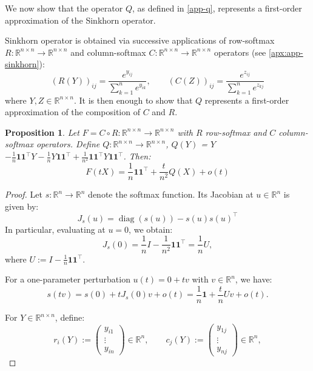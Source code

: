 \documentclass{article}
\newcommand{\R}{\mathbb{R}}
\theoremstyle{definition}
\theoremstyle{plain}
\newtheorem{proposition}{Proposition}
\newcommand{\lra}{\longrightarrow}
\begin{document}
\begin{appendices}
We now show that the operator $Q$, as defined in \cref{app-q}, represents a first-order approximation of the Sinkhorn operator. 

Sinkhorn operator is obtained via successive applications of row-softmax $R:\R^{n\times n} \lra \R^{n\times n}$ and column-softmax $C:\R^{n\times n} \lra \R^{n\times n}$ operators (see \cref{apx:app-sinkhorn}):
\[
(R(Y))_{ij} = \frac{e^{y_{ij}}}{\sum_{k=1}^n e^{y_{ik}}}, \qquad
(C(Z))_{ij} = \frac{e^{z_{ij}}}{\sum_{k=1}^n e^{z_{kj}}}
\]
where $Y, Z \in \R^{n\times n}$. It is then enough to show that $Q$ represents a first-order approximation of the composition of $C$ and $R$.

\begin{proposition}\label{sink_approx}
Let $F=C \circ R: \R^{n\times n} \lra \R^{n\times n}$ with $R$ row-softmax and $C$ column-softmax operators. Define $Q:\R^{n\times n} \lra \R^{n\times n}$,
$Q(Y) $ = $ Y$
$- \frac{1}{n} \mathbf{1}\mathbf{1}^\top Y
- \frac{1}{n} Y \mathbf{1}\mathbf{1}^\top
+ \frac{1}{n^2} \mathbf{1}\mathbf{1}^\top Y \mathbf{1}\mathbf{1}^\top$.
Then:
\begin{equation}\label{f-op}
F(tX)=\frac{1}{n}\mathbf{1}\mathbf{1}^\top+\frac{t}{n^2}Q(X)+o(t)
\end{equation}
\end{proposition}

\begin{proof}
Let $s: \R^n \lra \R^n$ denote the softmax function. Its Jacobian at $u \in \R^n$ is given by:
$$
J_s(u)=\operatorname{diag}(s(u)) - s(u)s(u)^\top
$$
In particular, evaluating at $u = 0$, we obtain:
\[
J_s(0) = \frac{1}{n} I - \frac{1}{n^2} \mathbf{1}\mathbf{1}^\top= \frac{1}{n} U,
\]
where $U := I - \frac{1}{n} \mathbf{1}\mathbf{1}^\top$.

For a one-parameter perturbation $u(t)=0+t v$ with $v\in\mathbb{R}^n$, we have:
\begin{equation}\label{softeq}
s(tv)=s(0)+tJ_s(0)v+o(t)=\frac{1}{n}\mathbf{1}+\frac{t}{n}Uv+o(t).
\end{equation}

For $Y\in \R^{n\times n}$, define:
$$
r_i(Y):=\begin{pmatrix}y_{i1}\\ \vdots \\ y_{in}\end{pmatrix}\in\mathbb{R}^n,
\qquad
c_j(Y):=\begin{pmatrix}y_{1j}\\ \vdots \\ y_{nj}\end{pmatrix}\in\mathbb{R}^n,
$$


\end{proof}
\end{appendices}
\end{document}
